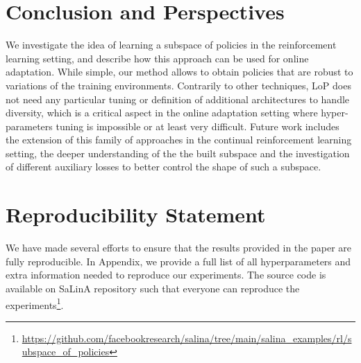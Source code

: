 \vspace{-0.2cm}
\section{Conclusion and Perspectives}
\vspace{-0.4cm}

We investigate  the idea of learning a subspace of policies in the reinforcement learning setting, and describe how this approach can be used for online adaptation. While simple, our method allows to obtain policies that are robust to variations of the training environments. Contrarily to other techniques, LoP does not need any particular tuning or definition of additional architectures to handle diversity, which is a critical aspect in the online adaptation setting where hyper-parameters tuning is impossible or at least very difficult. Future work includes the extension of this family of approaches in the continual reinforcement learning setting, the deeper understanding of the the built subspace and the investigation of different auxiliary losses to better control the shape of such a subspace. 

\section{Reproducibility Statement}
We have made several efforts to ensure that the results provided in the paper are fully reproducible. In Appendix, we provide a full list of all hyperparameters and extra information needed to reproduce our experiments. The source code is available on SaLinA repository such that everyone can reproduce the experiments\footnote{\url{https://github.com/facebookresearch/salina/tree/main/salina_examples/rl/subspace_of_policies}}.